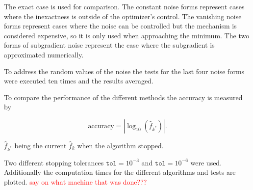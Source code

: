 The exact case is used for comparison. The constant noise forms represent cases where the inexactness is outside of the optimizer's control. The vanishing noise forms represent cases where the noise can be controlled  but the mechanism is considered expensive, so it is only used when approaching the minimum.
The two forms of subgradient noise represent the case where the subgradient is approximated numerically.

To address the random values of the noise the tests for the last four noise forms were executed ten times and the results averaged.

To compare the performance of the different methods the accuracy is measured by

\[ \text{accuracy} = |\log_{10}(\hat{f}_{k^*})|. \]

\(\hat{f}_{k^*}\) being the current \(\hat{f}_k\) when the algorithm stopped.

Two different stopping tolerances \(\mathtt{tol}=10^{-3}\) and \(\mathtt{tol}=10^{-6}\) were used.
Additionally the computation times for the different algorithms and tests are plotted. \textcolor{red}{say on what machine that was done???}



